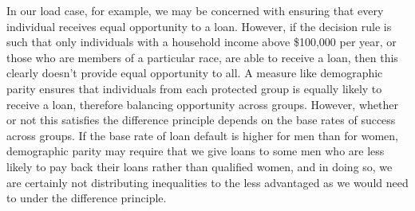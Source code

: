 In our load case, for example, we may be concerned with ensuring that every
individual receives equal opportunity to a loan. However, if the decision rule
is such that only individuals with a household income above \$100,000 per year,
or those who are members of a particular race, are able to receive a loan, then
this clearly doesn't provide equal opportunity to all. A measure like
demographic parity ensures that individuals from each protected group is equally
likely to receive a loan, therefore balancing opportunity across groups. However,
whether or not this satisfies the difference principle depends on the base rates
of success across groups. If the base rate of loan default is higher for men
than for women, demographic parity may require that we give loans to some men
who are less likely to pay back their loans rather than qualified women, and in
doing so, we are certainly not distributing inequalities to the less advantaged
as we would need to under the difference principle.
